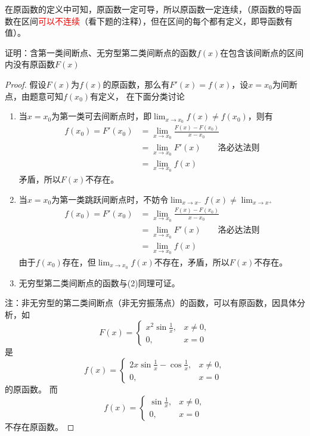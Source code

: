 在原函数的定义中可知，原函数一定可导，所以原函数一定连续，（原函数的导函数在区间\textcolor{red}{可以不连续}（看下题的注释），但在区间的每个都有定义，即导函数有值）。
\begin{example}
    证明：含第一类间断点、无穷型第二类间断点的函数$f(x)$在包含该间断点的区间内没有原函数$F(x)$
\end{example}
\begin{proof}
    假设$F(x)$为$f(x)$的原函数，那么有$F'(x)=f(x)$，设$x=x_0$为间断点，由题意可知$f(x_0)$有定义，
    在下面分类讨论
    \begin{enumerate}[(1)]
        \item 当$x=x_0$为第一类可去间断点时，即$\lim_{x\to x_0} f(x) \neq f(x_0)$，则有
              \begin{align*}
                  f(x_0) = F'(x_0) & = \lim_{x\to x_0}\frac{F(x)-F(x_0)}{x-x_0}     \\
                                   & =\lim_{x\to x_0}F'(x) \qquad \text{洛必达法则} \\
                                   & = \lim_{x\to x_0} f(x)
              \end{align*}
              矛盾，所以$F(x)$不存在。
        \item 当$x=x_0$为第一类跳跃间断点时，不妨令$\lim_{x\to x^-} f(x) \neq \lim_{x\to x^+}$
              \begin{align*}
                  f(x_0) = F'(x_0) & = \lim_{x\to x_0}\frac{F(x)-F(x_0)}{x-x_0}     \\
                                   & =\lim_{x\to x_0}F'(x) \qquad \text{洛必达法则} \\
                                   & = \lim_{x\to x_0} f(x)
              \end{align*}
              由于$f(x_0)$存在，但$\lim_{x\to x_0} f(x)$不存在，矛盾，所以$F(x)$不存在。
        \item 无穷型第二类间断点的函数与(2)同理可证。
    \end{enumerate}
    注：非无穷型的第二类间断点（非无穷振荡点）的函数，可以有原函数，因具体分析，如
    \[
        F(x)=
        \begin{cases}
            x^2\sin\frac{1}{x}, & x\neq 0, \\
            0,                  & x=0
        \end{cases}
    \]
    是
    \[
        f(x)=
        \begin{cases}
            2x\sin\frac{1}{x} - \cos\frac{1}{x}, & x\neq 0, \\
            0,                                   & x=0
        \end{cases}
    \]
    的原函数。
    而
    \[
        f(x)=
        \begin{cases}
            \sin\frac{1}{x}, & x\neq 0, \\
            0,               & x=0
        \end{cases}
    \]
    不存在原函数。
\end{proof}

